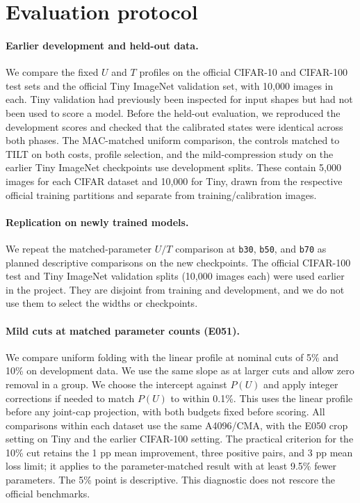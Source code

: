 \documentclass[11pt,a4paper]{article}
\newcommand{\Tilt}{TILT}
\newcommand{\bthirty}{\texttt{b30}}
\newcommand{\bfifty}{\texttt{b50}}
\newcommand{\bseventy}{\texttt{b70}}
\begin{document}
\section{Evaluation protocol}
\label{sec:evaluation}

\paragraph{Earlier development and held-out data.} We compare the fixed $U$ and
$T$ profiles on the official CIFAR-10 and CIFAR-100 test sets and the
official Tiny ImageNet validation set, with 10,000 images in each. Tiny
validation had previously been inspected for input shapes but had not
been used to score a model. Before the held-out evaluation, we reproduced
the development scores and checked that the calibrated states were
identical across both phases. The MAC-matched uniform comparison, the
controls matched to \Tilt{} on both costs, profile selection, and the
mild-compression study on the earlier Tiny ImageNet checkpoints use development splits.
These contain 5,000 images for each CIFAR dataset and 10,000 for Tiny,
drawn from the respective official training partitions and separate from
training/calibration images.

\paragraph{Replication on newly trained models.} We repeat the
matched-parameter $U/T$ comparison at \bthirty{}, \bfifty{}, and
\bseventy{} as planned descriptive comparisons on the new checkpoints.
The official CIFAR-100 test and Tiny ImageNet validation
splits (10,000 images each) were used earlier in the project. They are
disjoint from training and development, and we do not use them to
select the widths or checkpoints.

\paragraph{Mild cuts at matched parameter counts (E051).} We compare
uniform folding with the linear profile at nominal cuts of 5\% and 10\%
on development data. We use the same slope as at larger cuts and allow
zero removal in a group. We choose the intercept against $P(U)$ and
apply integer corrections if needed to match $P(U)$ to within 0.1\%.
This uses the linear profile before any joint-cap projection, with both
budgets fixed before scoring. All comparisons within each dataset use
the same A4096/CMA, with the E050 crop setting on Tiny and the earlier
CIFAR-100 setting. The practical criterion for the 10\% cut retains the
1 pp mean improvement, three positive pairs, and 3 pp mean loss limit;
it applies to the parameter-matched result with at least 9.5\% fewer
parameters. The 5\% point is descriptive. This diagnostic does not
rescore the official benchmarks.
\end{document}
